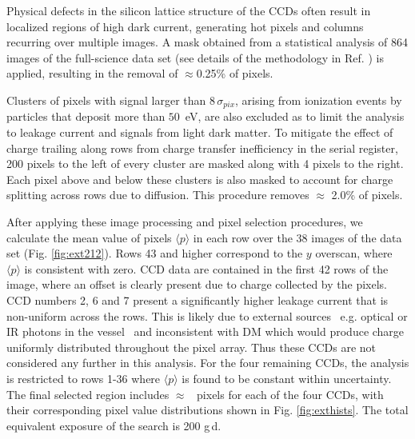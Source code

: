 \documentclass[aps,amsmath,amssymb,twocolumn,superscriptaddress,nofootinbib]{revtex4-1}
\begin{document}
Physical defects in the silicon lattice structure of the CCDs often result in localized regions of high dark current, generating hot pixels and columns recurring over multiple images. A mask obtained from a statistical analysis of 864 images of the full-science data set (see details of the methodology in Ref. \cite{aguilar:2017}) is applied, resulting in the removal of $\approx$0.25\% of pixels.

Clusters of pixels with signal larger than 8\,$\sigma_{pix}$, arising from ionization events by particles \cite{Aguilar-Arevalo:2016} that deposit more than $50$~eV, are also excluded as to limit the analysis to leakage current and signals from light dark matter. To mitigate the effect of charge trailing along rows from charge transfer inefficiency in the serial register, 200 pixels to the left of every cluster are masked along with 4 pixels to the right. Each pixel above and below these clusters is also masked to account for charge splitting across rows due to diffusion. This procedure removes $\approx$ 2.0\% of pixels.

After applying these image processing and pixel selection procedures, we calculate the mean value of pixels $\langle p \rangle$ in each row over the 38 images of the data set (Fig. \ref{fig:ext212}). Rows 43 and higher correspond to the $y$ overscan, where $\langle p \rangle$ is consistent with zero. CCD data are contained in the first 42 rows of the image, where an offset is clearly present due to charge collected by the pixels. CCD numbers 2, 6 and 7 present a significantly higher leakage current that is non-uniform across the rows. This is likely due to external sources \textemdash\ e.g. optical or IR photons in the vessel \textemdash\ and inconsistent with DM which would produce charge uniformly distributed throughout the pixel array. Thus these CCDs are not considered any further in this analysis. For the four remaining CCDs, the analysis is restricted to rows 1-36 where $\langle p \rangle$ is found to be constant within uncertainty. The final selected region includes $\approx$ ~pixels for each of the four CCDs, with their corresponding pixel value distributions shown in Fig. \ref{fig:exthists}. The total equivalent exposure of the search is 200 g\,d.
\end{document}
